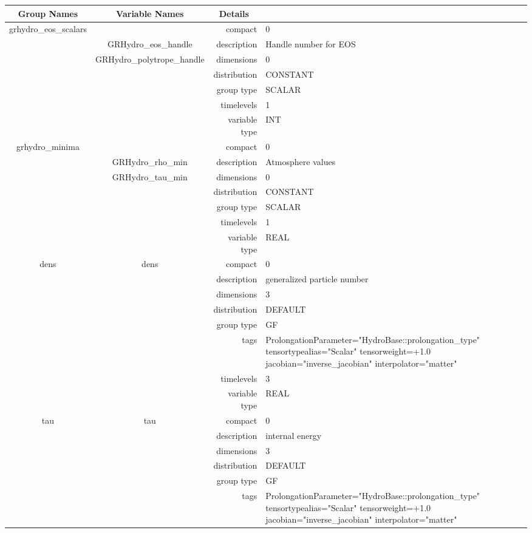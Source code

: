 \begin{tabular*}{150mm}{|c|c@{\extracolsep{\fill}}|rl|} \hline 
~ {\bf Group Names} ~ & ~ {\bf Variable Names} ~  &{\bf Details} ~ & ~\\ 
\hline 
grhydro\_eos\_scalars &  & compact & 0 \\ 
 & GRHydro\_eos\_handle & description & Handle number for EOS \\ 
 & GRHydro\_polytrope\_handle & dimensions & 0 \\ 
 &  & distribution & CONSTANT \\ 
 &  & group type & SCALAR \\ 
 &  & timelevels & 1 \\ 
 &  & variable type & INT \\ 
\hline 
grhydro\_minima &  & compact & 0 \\ 
 & GRHydro\_rho\_min & description & Atmosphere values \\ 
 & GRHydro\_tau\_min & dimensions & 0 \\ 
 &  & distribution & CONSTANT \\ 
 &  & group type & SCALAR \\ 
 &  & timelevels & 1 \\ 
 &  & variable type & REAL \\ 
\hline 
dens & dens & compact & 0 \\ 
 &  & description & generalized particle number \\ 
 &  & dimensions & 3 \\ 
 &  & distribution & DEFAULT \\ 
 &  & group type & GF \\ 
 &  & tags & ProlongationParameter="HydroBase::prolongation\_type" tensortypealias="Scalar" tensorweight=+1.0 jacobian="inverse\_jacobian" interpolator="matter" \\ 
 &  & timelevels & 3 \\ 
 &  & variable type & REAL \\ 
\hline 
tau & tau & compact & 0 \\ 
 &  & description & internal energy \\ 
 &  & dimensions & 3 \\ 
 &  & distribution & DEFAULT \\ 
 &  & group type & GF \\ 
 &  & tags & ProlongationParameter="HydroBase::prolongation\_type" tensortypealias="Scalar" tensorweight=+1.0 jacobian="inverse\_jacobian" interpolator="matter" \\ 

\end{tabular*}
